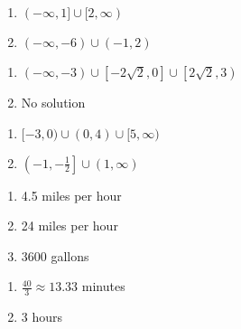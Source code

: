 \begin{multicols}{2}
\begin{enumerate}
\setcounter{enumi}{\value{HW}}

\item $(-\infty, 1] \cup [2, \infty)$
\item $(-\infty, -6) \cup (-1, 2)$

\setcounter{HW}{\value{enumi}}
\end{enumerate}
\end{multicols}

\begin{multicols}{2}
\begin{enumerate}
\setcounter{enumi}{\value{HW}}

\item $(-\infty, -3) \cup \left[-2\sqrt{2}, 0\right] \cup \left[2\sqrt{2}, 3\right)$
\item No solution

\setcounter{HW}{\value{enumi}}
\end{enumerate}
\end{multicols}

\begin{multicols}{2}
\begin{enumerate}
\setcounter{enumi}{\value{HW}}

\item $[-3,0) \cup (0,4) \cup [5, \infty)$
\item  $\left(-1,-\frac{1}{2}\right] \cup (1, \infty)$

\setcounter{HW}{\value{enumi}}
\end{enumerate}
\end{multicols}


\begin{multicols}{3}
\begin{enumerate}
\setcounter{enumi}{\value{HW}}

\item  4.5 miles per hour

\item  24 miles per hour

\item  3600 gallons

\setcounter{HW}{\value{enumi}}
\end{enumerate}
\end{multicols}

\begin{multicols}{3}
\begin{enumerate}
\setcounter{enumi}{\value{HW}}

\item  $\frac{40}{3} \approx 13.33$ minutes

\item 3 hours

\setcounter{HW}{\value{enumi}}
\end{enumerate}
\end{multicols}

